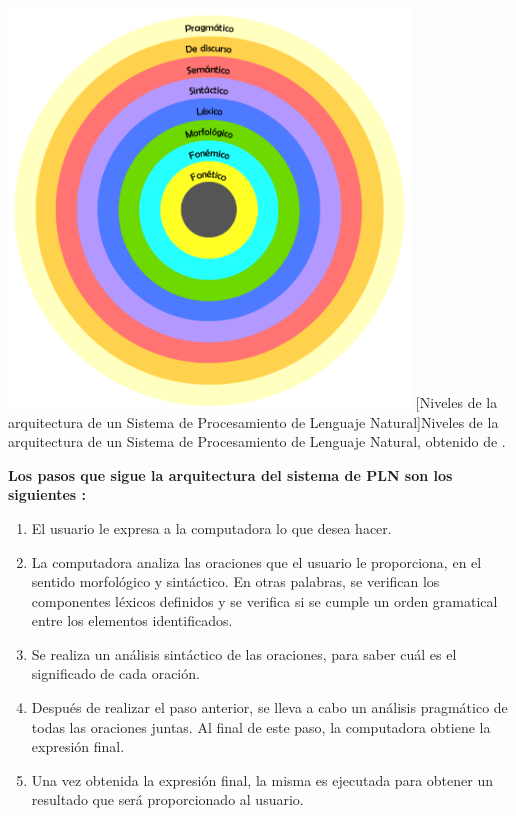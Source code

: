 \begin{center}
    \includegraphics[width=0.8\textwidth]{Images/Cap 2/Niveles_Arquitectura_PLN.png}
    [Niveles de la arquitectura de un Sistema de Procesamiento de Lenguaje Natural]{Niveles de la arquitectura de un Sistema de Procesamiento de Lenguaje Natural, obtenido de \cite{ref46}.}  %
\end{center}

\textbf{Los pasos que sigue la arquitectura del sistema de PLN son los siguientes \cite{ref46}:}
\begin{enumerate}
    \item El usuario le expresa a la computadora lo que desea hacer.\\
    \item La computadora analiza las oraciones que el usuario le proporciona, en el sentido morfológico y sintáctico. En otras palabras, se verifican los componentes léxicos definidos y se verifica si se cumple un orden gramatical entre los elementos identificados.\\
    \item Se realiza un análisis sintáctico de las oraciones, para saber cuál es el significado de cada oración.\\
    \item Después de realizar el paso anterior, se lleva a cabo un análisis pragmático de todas las oraciones juntas. Al final de este paso, la computadora obtiene la expresión final.\\
    \item Una vez obtenida la expresión final, la misma es ejecutada para obtener un resultado que será proporcionado al usuario.
\end{enumerate}

